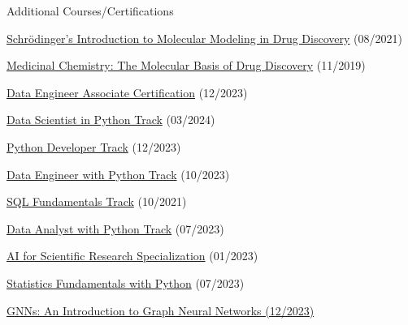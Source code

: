 \begin{cventries}
  \cventry
    {}
    {Additional Courses/Certifications}
    {}
    {}
    {
        \begin{cvitems}
            \item{\href{https://api.badgr.io/public/assertions/zZ7-bHnkTcm6H_UNr2s-LA}{Schrödinger's Introduction to Molecular Modeling in Drug Discovery} (08/2021)}           
            \item{\href{https://courses.edx.org/certificates/27307d91954041dab94af0ff554bc378}{Medicinal Chemistry: The Molecular Basis of Drug Discovery} (11/2019)}
            \item{\href{https://www.datacamp.com/certificate/DEA0011913814162}{Data Engineer Associate Certification} (12/2023)}
            \item{\href{https://www.datacamp.com/completed/statement-of-accomplishment/track/af77456b193609f6a644bffc88e1b7d761230908}{Data Scientist in Python Track} (03/2024)}
            \item{\href{https://www.datacamp.com/statement-of-accomplishment/track/d27013d491083bee7eb7302d45d142e6eff5c4c9}{Python Developer Track} (12/2023)}
            \item{\href{https://www.datacamp.com/completed/statement-of-accomplishment/track/fb10963085f36d129d1ac686f14acd5bb255d33d}{Data Engineer with Python Track} (10/2023)}
            \item{\href{https://www.datacamp.com/statement-of-accomplishment/track/941904e6394e2951693441d466f4643e5edfb4de}{SQL Fundamentals Track} (10/2021)}
            \item{\href{https://www.datacamp.com/completed/statement-of-accomplishment/track/4d9fb22f2514baecb5866aecd4421ba951e418a1}{Data Analyst with Python Track} (07/2023)}
            \item{\href{https://www.coursera.org/account/accomplishments/specialization/XU23J53N3SAW}{AI for Scientific Research Specialization} (01/2023)}
            \item{\href{https://www.datacamp.com/completed/statement-of-accomplishment/track/f6b840f135825806cde25b622730d804b8e9b987}{Statistics Fundamentals with Python} (07/2023)}
            \item{\href{https://skillsoft.digitalbadges.skillsoft.com/30851258-8ee5-4f58-86ba-9a0e152c8434#gs.1s8e65}{GNNs: An Introduction to Graph Neural Networks (12/2023)}}

\end{cvitems}}
\end{cventries}
